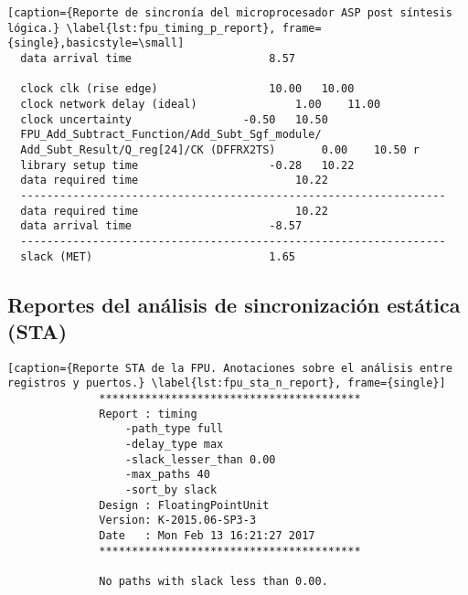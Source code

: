 \begin{lstlisting}[caption={Reporte de sincronía del microprocesador ASP post síntesis lógica.} \label{lst:fpu_timing_p_report}, frame={single},basicstyle=\small]
  data arrival time						8.57

  clock clk (rise edge)					10.00	10.00
  clock network delay (ideal)				1.00	11.00
  clock uncertainty					-0.50	10.50
  FPU_Add_Subtract_Function/Add_Subt_Sgf_module/
  Add_Subt_Result/Q_reg[24]/CK (DFFRX2TS)		0.00	10.50 r
  library setup time					-0.28	10.22
  data required time						10.22
  -----------------------------------------------------------------
  data required time						10.22
  data arrival time						-8.57
  -----------------------------------------------------------------
  slack (MET)							1.65
\end{lstlisting}

\subsection{Reportes del análisis de sincronización estática (STA)}
\begin{lstlisting}[caption={Reporte STA de la FPU. Anotaciones sobre el análisis entre registros y puertos.} \label{lst:fpu_sta_n_report}, frame={single}]
              ****************************************
              Report : timing
                  -path_type full
                  -delay_type max
                  -slack_lesser_than 0.00
                  -max_paths 40
                  -sort_by slack
              Design : FloatingPointUnit
              Version: K-2015.06-SP3-3
              Date   : Mon Feb 13 16:21:27 2017
              ****************************************

              No paths with slack less than 0.00.
\end{lstlisting}


